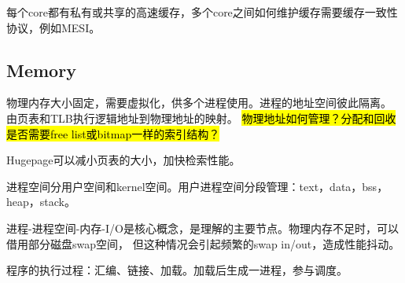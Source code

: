 每个core都有私有或共享的高速缓存，多个core之间如何维护缓存需要缓存一致性协议，例如MESI。

\subsection{Memory}

物理内存大小固定，需要虚拟化，供多个进程使用。进程的地址空间彼此隔离。
由页表和TLB执行逻辑地址到物理地址的映射。
\hl{物理地址如何管理？分配和回收是否需要free list或bitmap一样的索引结构？}

Hugepage可以减小页表的大小，加快检索性能。

进程空间分用户空间和kernel空间。用户进程空间分段管理：text，data，bss，heap，stack。

进程-进程空间-内存-I/O是核心概念，是理解的主要节点。物理内存不足时，可以借用部分磁盘swap空间，
但这种情况会引起频繁的swap in/out，造成性能抖动。

程序的执行过程：汇编、链接、加载。加载后生成一进程，参与调度。
